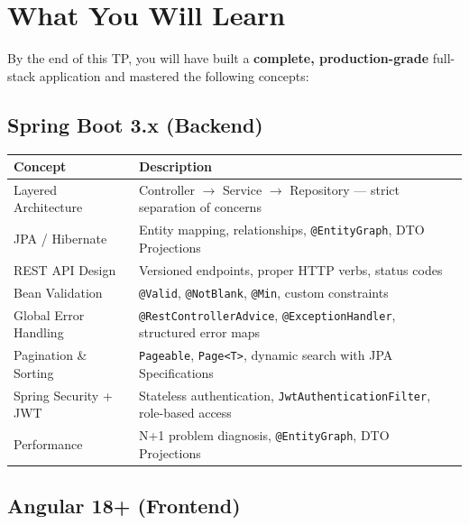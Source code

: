 \documentclass[12pt,a4paper]{report}
\begin{document}
\chapter{What You Will Learn}

By the end of this TP, you will have built a \textbf{complete, production-grade} full-stack application and mastered the following concepts:

\section{Spring Boot 3.x (Backend)}

\begin{longtable}{p{4.5cm}p{9cm}}
\toprule
\textbf{Concept} & \textbf{Description} \\
\midrule
\endhead
Layered Architecture & Controller $\to$ Service $\to$ Repository --- strict separation of concerns \\[0.3cm]
JPA / Hibernate & Entity mapping, relationships, \texttt{@EntityGraph}, DTO Projections \\[0.3cm]
REST API Design & Versioned endpoints, proper HTTP verbs, status codes \\[0.3cm]
Bean Validation & \texttt{@Valid}, \texttt{@NotBlank}, \texttt{@Min}, custom constraints \\[0.3cm]
Global Error Handling & \texttt{@RestControllerAdvice}, \texttt{@ExceptionHandler}, structured error maps \\[0.3cm]
Pagination \& Sorting & \texttt{Pageable}, \texttt{Page<T>}, dynamic search with JPA Specifications \\[0.3cm]
Spring Security + JWT & Stateless authentication, \texttt{JwtAuthenticationFilter}, role-based access \\[0.3cm]
Performance & N+1 problem diagnosis, \texttt{@EntityGraph}, DTO Projections \\
\bottomrule
\end{longtable}

\section{Angular 18+ (Frontend)}
\end{document}

